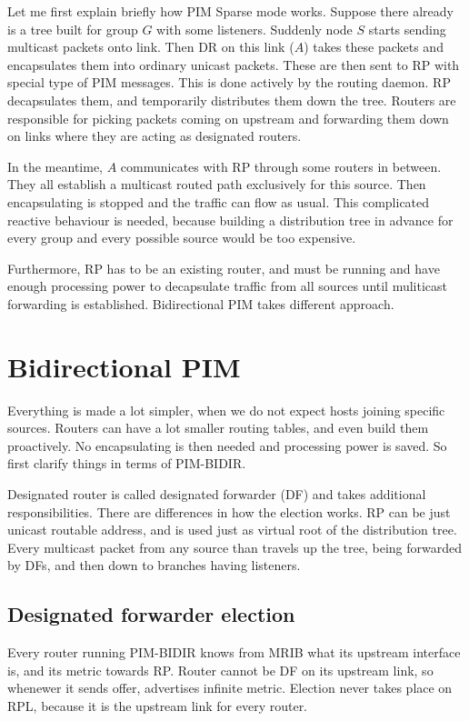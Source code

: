 Let me first explain briefly how PIM Sparse mode works. Suppose there already
is a tree built for group $G$ with some listeners. Suddenly node $S$ starts
sending multicast packets onto link. Then DR on this link ($A$) takes these
packets and encapsulates them into ordinary unicast packets. These are then
sent to RP with special type of PIM messages. This is done actively by the
routing daemon. RP decapsulates them, and temporarily distributes them down the
tree. Routers are responsible for picking packets coming on upstream and
forwarding them down on links where they are acting as designated routers.

In the meantime, $A$ communicates with RP through some routers in between. They
all establish a multicast routed path exclusively for this source. Then
encapsulating is stopped and the traffic can flow as usual. This complicated
reactive behaviour is needed, because building a distribution tree in advance
for every group and every possible source would be too expensive.

Furthermore, RP has to be an existing router, and must be running and have
enough processing power to decapsulate traffic from all sources until
muliticast forwarding is established. Bidirectional PIM takes different
approach.

\section{Bidirectional PIM}

Everything is made a lot simpler, when we do not expect hosts joining specific
sources. Routers can have a lot smaller routing tables, and even build them
proactively. No encapsulating is then needed and processing power is saved. So
first clarify things in terms of PIM-BIDIR.

Designated router is called designated forwarder (DF) and takes additional
responsibilities. There are differences in how the election works. RP can be
just unicast routable address, and is used just as virtual root of the
distribution tree. Every multicast packet from any source than travels up the
tree, being forwarded by DFs, and then down to branches having listeners.

\subsection{Designated forwarder election}

Every router running PIM-BIDIR knows from MRIB what its upstream interface is,
and its metric towards RP. Router cannot be DF on its upstream link, so
whenewer it sends offer, advertises infinite metric. Election never takes place
on RPL, because it is the upstream link for every router.

